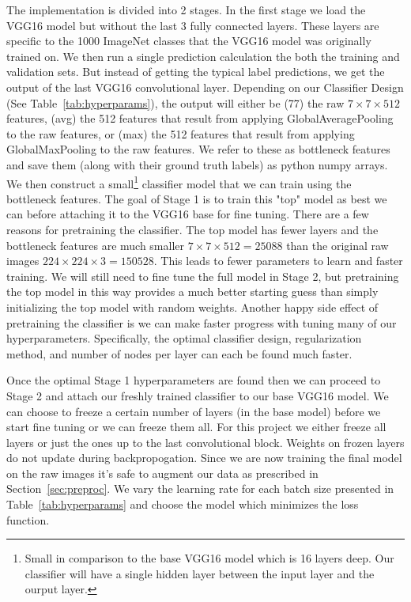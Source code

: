 \documentclass[12pt,journal,compsoc]{IEEEtran}
\begin{document}

The implementation is divided into 2 stages. In the first stage we load the VGG16 model but without the last 3 fully connected layers.  These layers are specific to the 1000 ImageNet classes that the VGG16 model was originally trained on.  We then run a single prediction calculation the both the training and validation sets. But instead of getting the typical label predictions, we get the output of the last VGG16 convolutional layer.   Depending on our Classifier Design (See Table~\ref{tab:hyperparams}), the output will either be (77) the raw $7\times7\times512$ features, (avg) the 512 features that result from applying GlobalAveragePooling to the raw features, or (max) the 512 features that result from applying GlobalMaxPooling to the raw features.  We refer to these as bottleneck features and save them (along with their ground truth labels) as python numpy arrays.  We then construct a small\footnote{Small in comparison to the base VGG16 model which is 16 layers deep.  Our classifier will have a single hidden layer between the input layer and the ourput layer.} classifier model that we can train using the bottleneck features.  The goal of Stage 1 is to train this "top" model as best we can before attaching it to the VGG16 base for fine tuning.  There are a few reasons for pretraining the classifier.  The top model has fewer layers and the bottleneck features are much smaller $7\times7\times512=25088$ than the original raw images $224\times224\times3=150528$. This leads to fewer parameters to learn and faster training.  We will still need to fine tune the full model in Stage 2, but pretraining the top model in this way provides a much better starting guess than simply initializing the top model with random weights.  Another happy side effect of pretraining the classifier is we can make faster progress with tuning many of our hyperparameters.  Specifically, the optimal classifier design, regularization method, and number of nodes per layer can each be found much faster.

Once the optimal Stage 1 hyperparameters are found then we can proceed to Stage 2 and attach our freshly trained classifier to our base VGG16 model.  We can choose to freeze a certain number of layers (in the base model) before we start fine tuning or we can freeze them all.  For this project we either freeze all layers or just the ones up to the last convolutional block. Weights on frozen layers do not update during backpropogation.  Since we are now training the final model on the raw images it's safe to augment our data as prescribed in Section~\ref{sec:preproc}.  We vary the learning rate for each batch size presented in Table~\ref{tab:hyperparams} and choose the model which minimizes the loss function. 
\end{document}
